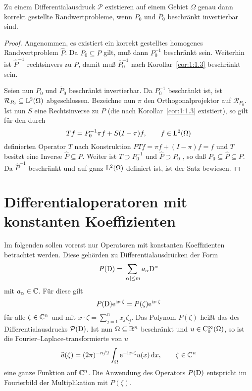 \begin{thm}
Zu einem Differentialausdruck $\mathcal P$ existieren auf einem Gebiet $\Omega$ genau dann korrekt gestellte Randwertprobleme, wenn $P_0$ und $\overline P_0$
beschr\"ankt invertierbar sind.
\end{thm} 
\begin{proof} 
Angenommen, es existiert ein korrekt gestelltes homogenes Randwertproblem $\widehat P$. Da $P_0\subseteq \widehat P$ gilt, muß dann $P_0^{-1}$ beschränkt sein. Weiterhin ist $\widehat P^{-1}$ rechtsinvers zu $P$, damit muß $\overline P_0^{-1}$ nach Korollar~\ref{cor:1:1.3} beschränkt sein.

Seien nun $P_0$ und $\overline P_0$ beschränkt invertierbar. Da $P_0^{-1}$ beschr\"ankt ist, ist $\mathcal R_{P_0}\subseteq \mathrm L^2(\Omega)$ abgeschlossen.  Bezeichne nun $\pi$ den Orthogonalprojektor auf $\mathcal R_{P_0}$. Ist nun $S$ eine Rechtsinverse zu $P$ (die nach  Korollar~\ref{cor:1:1.3} existiert), so gilt für
den durch  
\begin{equation}
  Tf = P_0^{-1} \pi f + S(I-\pi) f,\qquad f\in\mathrm L^2(\Omega) 
\end{equation}
definierten Operator $T$ nach Konstruktion $PT f = \pi f + (I-\pi) f = f$ und $T$ besitzt eine Inverse $\widehat P \subseteq P$. Weiter ist $T\supset P_0^{-1}$ und $\widehat P\supset P_0$ , so daß $P_0\subseteq \widehat P\subseteq P$. Da $\widehat P^{-1}$ beschränkt und auf ganz $\mathrm L^2(\Omega)$ definiert ist, ist der Satz bewiesen.
\end{proof}

\section{Differentialoperatoren mit konstanten Koeffizienten}
Im folgenden sollen vorerst nur Operatoren mit konstanten Koeffizienten betrachtet werden. Diese gehörden zu Differentialausdrücken der Form
\begin{equation}
     P(\mathrm D) = \sum_{|\alpha|\le m} a_\alpha \mathrm D^\alpha
\end{equation}
mit $a_\alpha\in\mathbb C$. Für diese gilt 
\begin{equation}
     P(\mathrm D) \mathrm e^{\mathrm i x\cdot\zeta}  =  P(\zeta) \mathrm e^{\mathrm i x\cdot\zeta}
\end{equation}
für alle $\zeta\in\mathbb C^n$ und mit $x\cdot\zeta = \sum_{j=1}^n x_j\zeta_j$. Das Polynom $ P(\zeta)$ heißt das  des Differentialausdrucks $\mathcal P(\mathrm D)$. Ist nun $\Omega\subseteq\mathbb R^n$ beschränkt und $u\in\mathrm C_0^\infty(\Omega)$, so ist die Fourier--Laplace-transformierte von $u$
\begin{equation}
    \widehat u (\zeta) = (2\pi)^{-n/2} \int_\Omega \mathrm e^{-\mathrm i x\cdot\zeta } u(x) \,\mathrm d x,\qquad \zeta\in\mathbb C^n
\end{equation}
eine ganze Funktion auf $\mathbb C^n$. Die Anwendung des Operators $ P(\mathrm D)$ entspricht im Fourierbild der Multiplikation mit $ P(\zeta)$. 

